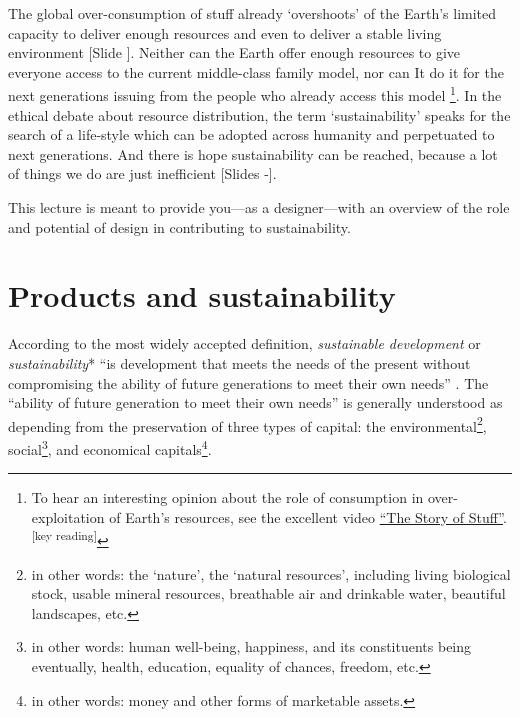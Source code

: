 \documentclass{article}
\newcounter{slide}
\begin{document}
The global over-consumption of stuff already `overshoots' of the Earth's limited capacity to deliver enough resources and even to deliver a stable living environment \cite{rockstromPlanetaryBoundariesExploring2009} {\color{blue}[Slide ]}. Neither can the Earth offer enough resources to give everyone access to the current middle-class family model, nor can It do it for the next generations issuing from the people who already access this model \footnote{To hear an interesting opinion about the role of consumption in over-exploitation of Earth's resources, see the excellent video \href{https://www.youtube.com/watch?v=9GorqroigqM&vl=fr}{``The Story of Stuff''}. \textsuperscript{\color{Magenta}[key reading]}}. In the ethical debate about resource distribution, the term `sustainability' speaks for the search of a life-style which can be adopted across humanity and perpetuated to next generations. And there is hope sustainability can be reached, because a lot of things we do are just inefficient {\color{blue}[Slides -]}.

This lecture is meant to provide you---as a designer---with an overview of the role and potential of design in contributing to sustainability. 

\section{Products and sustainability}
\label{sec:sustainability}

According to the most widely accepted definition, \emph{sustainable development} or \emph{sustainability}* ``is development that meets the needs of the present without compromising the ability of future generations to meet their own needs'' \cite{brundtland1987our}. The ``ability of future generation to meet their own needs'' is generally understood as depending from the preservation of three types of capital: the environmental\footnote{in other words: the `nature', the `natural resources', including living biological stock, usable mineral resources, breathable air and drinkable water, beautiful landscapes, etc.}, social\footnote{in other words: human well-being, happiness, and its constituents being eventually, health, education, equality of chances, freedom, etc.}, and economical capitals\footnote{in other words: money and other forms of marketable assets.}. 
\end{document}
